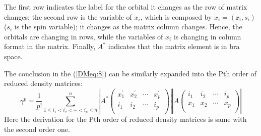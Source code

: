The first row indicates the label for the orbital it changes as the
row of matrix changes; the second row is the variable of $x_{i}$,
which is composed by $x_{i} = (\mathbf{r_{i}}, s_{i})$ ($s_{i}$ is
the spin variable); it changes as the matrix column changes. Hence,
the orbitals are changing in rows, while the variables of $x_{i}$ is
changing in column format in the matrix. Finally, $A^{*}$ indicates
that the matrix element is in bra space.

The conclusion in the (\ref{DMeq:8}) can be similarly expanded into
the Pth order of reduced density matrices:
\begin{equation}\label{DMeq:9}
  \gamma^{p} = \frac{1}{p!}\sum^{n}_{1 \leq i_{1}<i_{2}<\cdots<i_{p}
    \leq n}\left|A^{*}\begin{pmatrix}
                        x^{'}_{1} & x^{'}_{2} & \cdots & x^{'}_{p} \\
                        i_{1} & i_{2} & \cdots & i_{p} \\
                      \end{pmatrix}
\right| \left|A\begin{pmatrix}
                        i_{1} & i_{2} & \cdots & i_{p} \\
                        x_{1} & x_{2} & \cdots & x_{p} \\
                      \end{pmatrix}
\right|
\end{equation}
Here the derivation for the Pth order of reduced density matrices is
same with the second order one.

